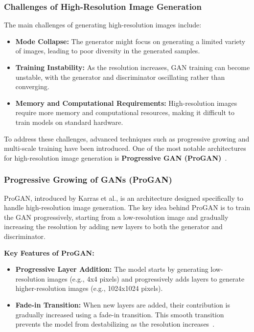 \subsubsection{Challenges of High-Resolution Image Generation}
The main challenges of generating high-resolution images include:
\begin{itemize}
    \item \textbf{Mode Collapse:} The generator might focus on generating a limited variety of images, leading to poor diversity in the generated samples.
    \item \textbf{Training Instability:} As the resolution increases, GAN training can become unstable, with the generator and discriminator oscillating rather than converging.
    \item \textbf{Memory and Computational Requirements:} High-resolution images require more memory and computational resources, making it difficult to train models on standard hardware.
\end{itemize}

To address these challenges, advanced techniques such as progressive growing and multi-scale training have been introduced. One of the most notable architectures for high-resolution image generation is \textbf{Progressive GAN (ProGAN)}~\cite{he2018probgan}.

\subsubsection{Progressive Growing of GANs (ProGAN)}
ProGAN, introduced by Karras et al., is an architecture designed specifically to handle high-resolution image generation. The key idea behind ProGAN is to train the GAN progressively, starting from a low-resolution image and gradually increasing the resolution by adding new layers to both the generator and discriminator.

\textbf{Key Features of ProGAN:}
\begin{itemize}
    \item \textbf{Progressive Layer Addition:} The model starts by generating low-resolution images (e.g., 4x4 pixels) and progressively adds layers to generate higher-resolution images (e.g., 1024x1024 pixels).
    \item \textbf{Fade-in Transition:} When new layers are added, their contribution is gradually increased using a fade-in transition. This smooth transition prevents the model from destabilizing as the resolution increases~\cite{he2018probgan}.
\end{itemize}

